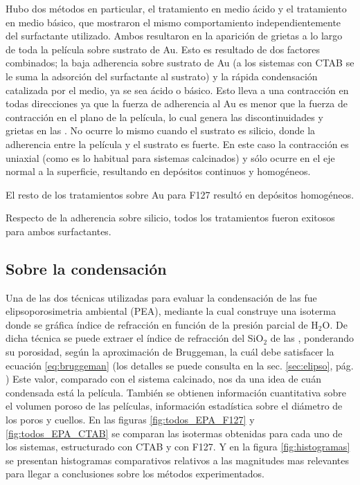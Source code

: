 			Hubo dos métodos en particular, el tratamiento en medio ácido y el tratamiento en medio básico, que mostraron el mismo comportamiento independientemente del surfactante utilizado. Ambos resultaron en la aparición de grietas a lo largo de toda la película sobre sustrato de Au. Esto es resultado de dos factores combinados; la baja adherencia sobre sustrato de Au (a los sistemas con CTAB se le suma la adsorción del surfactante al sustrato) y la rápida condensación catalizada por el medio, ya se sea ácido o básico. Esto lleva a una contracción en todas direcciones ya que la fuerza de adherencia al Au es menor que la fuerza de contracción en el plano de la película, lo cual genera las discontinuidades y grietas en las \pdm. No ocurre lo mismo cuando el sustrato es silicio, donde la adherencia entre la película y el sustrato es fuerte. En este caso la contracción es uniaxial (como es lo habitual para sistemas calcinados) y sólo ocurre en el eje normal a la superficie, resultando en depósitos continuos y homogéneos.

			El resto de los tratamientos sobre Au para F127 resultó en depósitos homogéneos.

			Respecto de la adherencia sobre silicio, todos los tratamientos fueron exitosos para ambos surfactantes.

	\subsection{Sobre la condensación}

		Una de las dos técnicas utilizadas para evaluar la condensación de las \pdm\space fue elipsoporosimetria ambiental (PEA), mediante la cual construye una isoterma donde se gráfica índice de refracción en función de la presión parcial de H$_2$O. De dicha técnica se puede extraer el índice de refracción del SiO$_2$ de las \pdm, ponderando su porosidad, según la aproximación de Bruggeman, la cuál debe satisfacer la ecuación \ref{eq:bruggeman} \cite{Bruggeman1935} (los detalles se puede consulta en la sec. \ref{sec:elipso}, pág. \pageref{sec:elipso}) Este valor, comparado con el sistema calcinado, nos da una idea de cuán condensada está la película. También se obtienen información cuantitativa sobre el volumen poroso de las películas, información estadística sobre el diámetro de los poros y cuellos. En las figuras \ref{fig:todos_EPA_F127} y \ref{fig:todos_EPA_CTAB} se comparan las isotermas obtenidas para cada uno de los sistemas, estructurado con CTAB y con F127. Y en la figura \ref{fig:histogramas} se presentan histogramas comparativos relativos a las magnitudes mas relevantes para llegar a conclusiones sobre los métodos experimentados.

